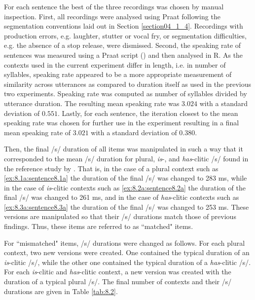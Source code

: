 For each sentence the best of the three recordings was chosen by manual inspection. First, all recordings were analysed using Praat following the segmentation conventions laid out in Section \ref{section04_1_4}. Recordings with production errors, e.g. laughter, stutter or vocal fry, or segmentation difficulties, e.g. the absence of a stop release, were dismissed. Second, the speaking rate of sentences was measured using a Praat script (\cite{deJong2008}) and then analysed in R. As the contexts used in the current experiment differ in length, i.e. in number of syllables, speaking rate appeared to be a more appropriate measurement of similarity across utterances as compared to duration itself as used in the previous two experiments. Speaking rate was computed as number of syllables divided by utterance duration. The resulting mean speaking rate was $3.024$ with a standard deviation of $0.551$. Lastly, for each sentence, the iteration closest to the mean speaking rate was chosen for further use in the experiment resulting in a final mean speaking rate of $3.021$ with a standard deviation of $0.380$.

Then, the final /s/ duration of all items was manipulated in such a way that it corresponded to the mean /s/ duration for plural, \textit{is}-, and \textit{has}-clitic /s/ found in the reference study by \citet{Plag2017}. That is, in the case of a plural context such as \ref{ex:8.1a:sentence8.1a} the duration of the final /s/ was changed to 283 ms, while in the case of \textit{is}-clitic contexts such as \ref{ex:8.2a:sentence8.2a} the duration of the final /s/ was changed to 261 ms, and in the case of \textit{has}-clitic contexts such as \ref{ex:8.3a:sentence8.3a} the duration of the final /s/ was changed to 253 ms. These versions are manipulated so that their /s/ durations match those of previous findings. Thus, these items are referred to as ``matched" items.

For ``mismatched" items, /s/ durations were changed as follows. For each plural context, two new versions were created. One contained the typical duration of an \textit{is}-clitic /s/, while the other one contained the typical duration of a \textit{has}-clitic /s/. For each \textit{is}-clitic and \textit{has}-clitic context, a new version was created with the duration of a typical plural /s/. The final number of contexts and their /s/ durations are given in Table \ref{tab:8.2}.

